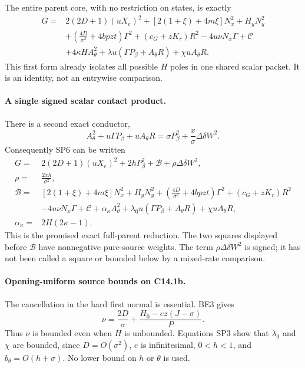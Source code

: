 The entire parent core, with no restriction on states, is exactly
\begin{align*}
G={}&2(2D+1)(uX_e)^2
 +[2(1+\xi)+4m\xi]N_x^2+H_yN_y^2\\
 &+\left(\frac{4D}{\sigma^2}+4bpzt\right)\Gamma^2
 +(c_G+zK_r)R^2-4u\nu N_x\Gamma+\mathscr C\\
 &+4\kappa H A_\theta^2
 +\lambda u(\Gamma P_\beta+A_\theta R)
 +\chi uA_\theta R.
 \tag{SP6}
\end{align*}
This first form already isolates all possible $H$ poles in one
shared scalar packet. It is an identity, not an entrywise comparison.

\paragraph{A single signed scalar contact product.}
There is a second exact conductor,
\[
 A_\theta^2+u\Gamma P_\beta+uA_\theta R
 =\sigma P_\beta^2+
       \frac{x}{\sigma}\Delta\delta W^2.
 \tag{SP7}
\]
Consequently SP6 can be written
\begin{align*}
 G={}&2(2D+1)(uX_e)^2+2hP_\beta^2+\mathscr B
               +\rho\Delta\delta W^2,\\
 \rho={}&\frac{2xh}{\sigma^2},\\
 \mathscr B={}&[2(1+\xi)+4m\xi]N_x^2+H_yN_y^2
 +\left(\frac{4D}{\sigma^2}+4bpzt\right)\Gamma^2
 +(c_G+zK_r)R^2\\
 &-4u\nu N_x\Gamma+\mathscr C+\alpha_\kappa A_\theta^2
 +\lambda_0u(\Gamma P_\beta+A_\theta R)+\chi uA_\theta R,\\
 \alpha_\kappa={}&2H(2\kappa-1).
 \tag{SP8}
\end{align*}
This is the promised exact full-parent reduction. The two squares
displayed before $\mathscr B$ have nonnegative pure-source weights.
The term $\rho\Delta\delta W^2$ is signed; it has not been called a
square or bounded below by a mixed-rate comparison.

\paragraph{Opening-uniform source bounds on C14.1b.}
The cancellation in the hard first normal is essential. BE3 gives
\[
 \nu=\frac{2D}{\sigma}
       +\frac{H_0-ez(J-\sigma)}{P}.
 \tag{SP9}
\]
Thus $\nu$ is bounded even when $H$ is unbounded. Equations SP3 show
that $\lambda_0$ and $\chi$ are bounded, since $D=O(\sigma^2)$,
$e$ is infinitesimal, $0<h<1$, and $b_\theta=O(h+\sigma)$.
No lower bound on $h$ or $\theta$ is used.

